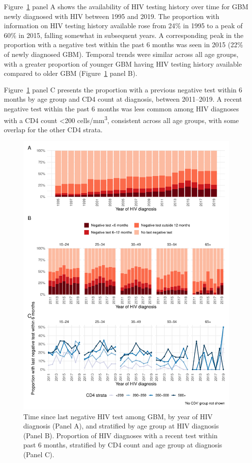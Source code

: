 

Figure~\ref{fig:ln_avail} panel A shows the availability of HIV testing history over time for GBM newly diagnosed with HIV between 1995 and 2019. The proportion with information on HIV testing history available rose from 24\% in 1995 to a peak of 60\% in 2015, falling somewhat in subsequent years. A corresponding peak in the proportion with a negative test within the past 6 months was seen in 2015 (22\% of newly diagnosed GBM). Temporal trends were similar across all age groups, with a greater proportion of younger GBM having HIV testing history available compared to older GBM (Figure~\ref{fig:ln_avail} panel B).

Figure~\ref{fig:ln_avail} panel C presents the proportion with a previous negative test within 6 months by age group and CD4 count at diagnosis, between 2011--2019. A recent negative test within the past 6 months was less common among HIV diagnoses with a CD4 count <200 cells/mm\textsuperscript{3}, consistent across all age groups, with some overlap for the other CD4 strata.

\begin{figure}[htbp!]
  \centering
  \includegraphics[width=\textwidth]{lntest_by_cd4.pdf}
  \caption[Time since last negative HIV test among GBM, by year of HIV diagnosis]{Time since last negative HIV test among GBM, by year of HIV diagnosis (Panel A), and stratified by age group at HIV diagnosis (Panel B). Proportion of HIV diagnoses with a recent test within past 6 months, stratified by CD4 count and age group at diagnosis (Panel C).}\label{fig:ln_avail}
\end{figure}

